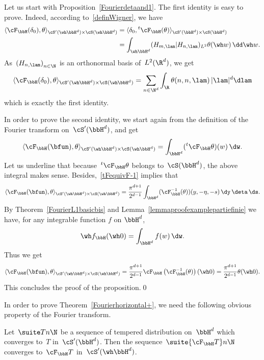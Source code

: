 Let us start with Proposition~\ref{Fourierdetaand1}. The first identity is easy to prove. Indeed, according to~\eqref{definWigner}, we have
\begin{align*}
\langle \cF_{\bbH}(\delta_0),\theta\rangle _{\cS'(\wh \bbH ^d)\times\cS(\wh \bbH ^d)} & = \langle \delta_0,{}^t \cF_{\bbH}(\theta)\rangle _{\cS'(\bbH ^d)\times\cS(\bbH ^d)} \\
& = \int_{\wh \bbH ^d} (H_{m,\lam}|H_{n,\lam})_{L^2} \theta (\wh w)\, \dd\wh w.
\end{align*}
As~$\left(H_{n,\lam}\right)_{n\in \N}$ is an orthonormal basis of~$L^2(\R^d)$, we get
\[
\langle \cF_{\bbH}(\delta_0),\theta\rangle _{\cS'(\wh \bbH ^d)\times\cS(\wh \bbH ^d)} = \sum_{n\in \N^d}\int_{\R} \theta (n,n,\lam)\,|\lam|^d \dlam
\]
which is exactly the first identity.

In order to prove the second identity, we start again from the definition of the Fourier transform on~$\cS'(\bbH^d)$, and get
\begin{equation}\label{Fourierdeltaet1Hdemoeq1}
\langle \cF_ {\bbH}(\bfun),\theta\rangle _{\cS'(\wh \bbH ^d)\times\cS(\wh \bbH ^d)} =\int_{\bbH^d}({}^t\cF_ {\bbH}\theta)(w) \,\dw.
\end{equation}
Let us underline that because~${}^t\cF_{\bbH}\theta$ belongs to~$\cS(\bbH^d)$, the above integral makes sense. Besides,~\eqref{tFequivF-1} implies that
\[
\langle \cF_{\bbH}(\bfun),\theta\rangle _{\cS'(\wh \bbH ^d)\times\cS(\wh \bbH ^d)} = \frac {\pi^{d+1}} {2^{d-1}}
\int_{\bbH^d} (\cF_{\bbH}^{-1} (\theta))(y,-\eta,-s) \,\dy\,\deta\, \ds.
\]
By Theorem~\ref{FourierL1basicbis} and Lemma~\ref{lemmaproofexamplepartiefinie} we have, for any integrable function $f$ on $\bbH^d$,
\[
\wh f_\bbH(\wh 0)= \int_{\bbH^d} f(w)\,\dw.
\]
Thus we get
\[
\langle \cF_{\bbH}(\bfun),\theta\rangle _{\cS'(\wh \bbH ^d)\times\cS(\wh \bbH ^d)} = \frac {\pi^{d+1}} {2^{d-1}}\cF_{\bbH} \left(\cF_{\bbH}^{-1} (\theta)\right)(\wh 0)= \frac {\pi^{d+1}} {2^{d-1}}\theta (\wh 0).
\]
This concludes the proof of the proposition.\qed

In order to prove Theorem~\ref{Fourierhorizontal+}, we need the following obvious property of the Fourier transform.

\begin{lemm}\label{contnuityFHcS'}
Let~$\suite T n \N$ be a sequence of tempered distribution on~$\bbH^d$ which converges to~$T$ in~$\cS'(\bbH^d)$. Then the sequence~$\suite {\cF_\bbH T} n \N$ converges to~$\cF_\bbH T$ in~$\cS'(\wh\bbH^d)$.
\end{lemm}

